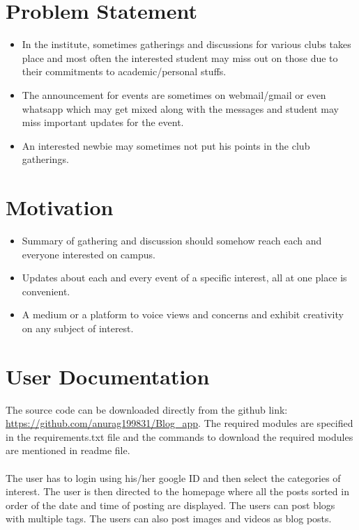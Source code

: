 \documentclass[oneside,a4paper,12pt]{article}
\begin{document}
\noindent
\vfill
\setlength{\parindent}{11mm}
\newpage
\section{Problem Statement}
\begin{itemize}
    \item In the institute, sometimes gatherings and discussions for various clubs takes place and most often the interested student may miss out on those due to their commitments to academic/personal stuffs.
    \item The announcement for events are sometimes on webmail/gmail or even whatsapp which may get mixed along with the messages and student may miss important updates for the event.
    \item An interested newbie may sometimes not put his points in the club gatherings.

\end{itemize}



\section{Motivation}
\begin{itemize}
    \item Summary of gathering and discussion should somehow reach each and everyone interested on campus.
\item Updates about each and every event of a specific interest, all at one place is convenient.
\item A medium or a platform to voice views and concerns and exhibit creativity on any subject of interest.

\end{itemize}

\section{User Documentation}
The source code can be downloaded directly from the github link: \url{https://github.com/anurag199831/Blog_app}.
The required modules are specified in the requirements.txt file and the commands to download the required modules are mentioned in readme file.
\\\\The user has to login using his/her google ID and then select the categories of interest. The user is then directed to the homepage where all the posts sorted in order of the date and time of posting are displayed. The users can post blogs with multiple tags. The users can also post images and videos as blog posts.
\end{document}
